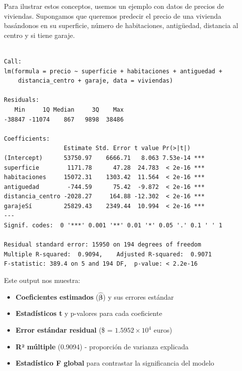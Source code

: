 \documentclass[
  letterpaper,
  DIV=11,
  numbers=noendperiod]{scrreprt}
\providecommand{\tightlist}{%
  \setlength{\itemsep}{0pt}\setlength{\parskip}{0pt}}
\begin{document}
\begin{tcolorbox}[enhanced jigsaw, breakable, toprule=.15mm, bottomtitle=1mm, coltitle=black, colbacktitle=quarto-callout-tip-color!10!white, titlerule=0mm, opacitybacktitle=0.6, bottomrule=.15mm, toptitle=1mm, title=\textcolor{quarto-callout-tip-color}{\faLightbulb}\hspace{0.5em}{Ejemplo: Estimación de un modelo múltiple}, arc=.35mm, rightrule=.15mm, opacityback=0, colframe=quarto-callout-tip-color-frame, leftrule=.75mm, left=2mm, colback=white]

Para ilustrar estos conceptos, usemos un ejemplo con datos de precios de
viviendas. Supongamos que queremos predecir el precio de una vivienda
basándonos en su superficie, número de habitaciones, antigüedad,
distancia al centro y si tiene garaje.

\begin{verbatim}

Call:
lm(formula = precio ~ superficie + habitaciones + antiguedad + 
    distancia_centro + garaje, data = viviendas)

Residuals:
   Min     1Q Median     3Q    Max 
-38847 -11074    867   9898  38486 

Coefficients:
                 Estimate Std. Error t value Pr(>|t|)    
(Intercept)      53750.97    6666.71   8.063 7.53e-14 ***
superficie        1171.78      47.28  24.783  < 2e-16 ***
habitaciones     15072.31    1303.42  11.564  < 2e-16 ***
antiguedad        -744.59      75.42  -9.872  < 2e-16 ***
distancia_centro -2028.27     164.88 -12.302  < 2e-16 ***
garajeSí         25829.43    2349.44  10.994  < 2e-16 ***
---
Signif. codes:  0 '***' 0.001 '**' 0.01 '*' 0.05 '.' 0.1 ' ' 1

Residual standard error: 15950 on 194 degrees of freedom
Multiple R-squared:  0.9094,    Adjusted R-squared:  0.9071 
F-statistic: 389.4 on 5 and 194 DF,  p-value: < 2.2e-16
\end{verbatim}

Este output nos muestra:

\begin{itemize}
\tightlist
\item
  \textbf{Coeficientes estimados} (\(\hat{\boldsymbol{\beta}}\)) y sus
  errores estándar
\item
  \textbf{Estadísticos t} y p-valores para cada coeficiente
\item
  \textbf{Error estándar residual} (\$\hat{\sigma} =
  \ensuremath{1.5952\times 10^{4}} euros)
\item
  \textbf{R² múltiple} (0.9094) - proporción de varianza explicada
\item
  \textbf{Estadístico F global} para contrastar la significancia del
  modelo
\end{itemize}

\end{tcolorbox}
\end{document}
